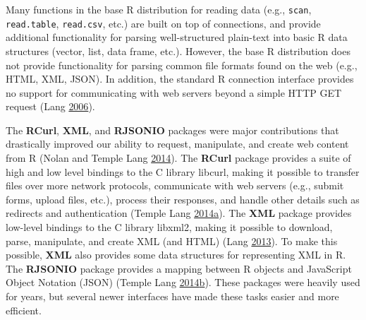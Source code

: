 \documentclass[12pt,]{isuthesis}
\begin{document}
Many functions in the base R distribution for reading data (e.g.,
\texttt{scan}, \texttt{read.table}, \texttt{read.csv}, etc.) are built
on top of connections, and provide additional functionality for parsing
well-structured plain-text into basic R data structures (vector, list,
data frame, etc.). However, the base R distribution does not provide
functionality for parsing common file formats found on the web (e.g.,
HTML, XML, JSON). In addition, the standard R connection interface
provides no support for communicating with web servers beyond a simple
HTTP GET request (Lang \protect\hyperlink{ref-Lang:2006us}{2006}).

The \textbf{RCurl}, \textbf{XML}, and \textbf{RJSONIO} packages were
major contributions that drastically improved our ability to request,
manipulate, and create web content from R (Nolan and Temple Lang
\protect\hyperlink{ref-nolan-lang}{2014}). The \textbf{RCurl} package
provides a suite of high and low level bindings to the C library
libcurl, making it possible to transfer files over more network
protocols, communicate with web servers (e.g., submit forms, upload
files, etc.), process their responses, and handle other details such as
redirects and authentication (Temple Lang
\protect\hyperlink{ref-RCurl}{2014}\protect\hyperlink{ref-RCurl}{a}).
The \textbf{XML} package provides low-level bindings to the C library
libxml2, making it possible to download, parse, manipulate, and create
XML (and HTML) (Lang \protect\hyperlink{ref-XML}{2013}). To make this
possible, \textbf{XML} also provides some data structures for
representing XML in R. The \textbf{RJSONIO} package provides a mapping
between R objects and JavaScript Object Notation (JSON) (Temple Lang
\protect\hyperlink{ref-RJSONIO}{2014}\protect\hyperlink{ref-RJSONIO}{b}).
These packages were heavily used for years, but several newer interfaces
have made these tasks easier and more efficient.
\end{document}
